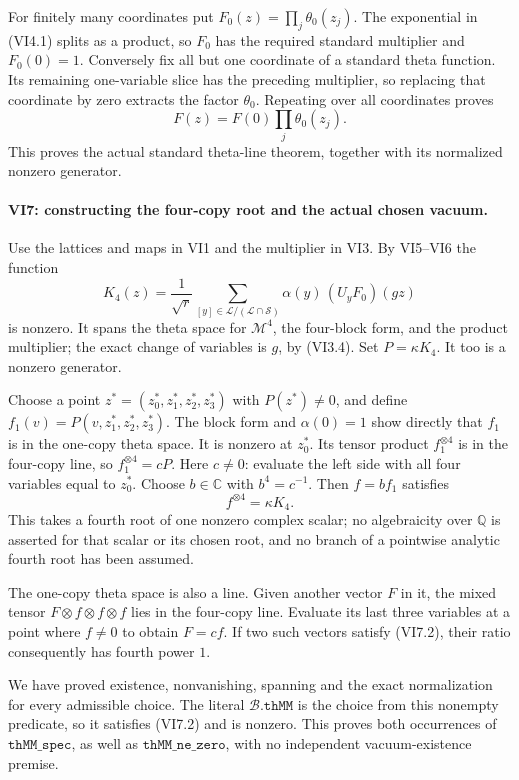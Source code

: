 For finitely many coordinates put
\(F_0(z)=\prod_j\theta_0(z_j)\). The exponential in (VI4.1)
splits as a product, so \(F_0\) has the required standard
multiplier and \(F_0(0)=1\). Conversely fix all but one
coordinate of a standard theta function. Its remaining
one-variable slice has the preceding multiplier, so replacing
that coordinate by zero extracts the factor \(\theta_0\).
Repeating over all coordinates proves
\[
               F(z)=F(0)\prod_j\theta_0(z_j).
 \tag{VI6.2}
\]
This proves the actual standard theta-line theorem, together
with its normalized nonzero generator.

\paragraph{VI7: constructing the four-copy root and the actual chosen vacuum.}
Use the lattices and maps in VI1 and the multiplier in VI3.
By VI5--VI6 the function
\[
 K_4(z)=
 \frac1{\sqrt r}
 \sum_{[y]\in\mathcal L/(\mathcal L\cap\mathcal S)}
       \alpha(y)\,(U_yF_0)(gz)
 \tag{VI7.1}
\]
is nonzero. It spans the theta space for \(\mathcal M^4\),
the four-block form, and the product multiplier; the exact
change of variables is \(g\), by (VI3.4).
Set \(P=\kappa K_4\). It too is a nonzero generator.

Choose a point \(z^*=(z_0^*,z_1^*,z_2^*,z_3^*)\) with
\(P(z^*)\ne0\), and define
\(f_1(v)=P(v,z_1^*,z_2^*,z_3^*)\).
The block form and \(\alpha(0)=1\) show directly that \(f_1\)
is in the one-copy theta space. It is nonzero at \(z_0^*\).
Its tensor product \(f_1^{\otimes4}\) is in the four-copy line,
so \(f_1^{\otimes4}=cP\). Here \(c\ne0\): evaluate the left
side with all four variables equal to \(z_0^*\).
Choose \(b\in\mathbb C\) with \(b^4=c^{-1}\). Then
\(f=bf_1\) satisfies
\[
                   f^{\otimes4}=\kappa K_4.
 \tag{VI7.2}
\]
This takes a fourth root of one nonzero complex scalar; no
algebraicity over \(\mathbb Q\) is asserted for that scalar
or its chosen root, and no branch of a pointwise analytic
fourth root has been assumed.

The one-copy theta space is also a line. Given another vector
\(F\) in it, the mixed tensor \(F\otimes f\otimes f\otimes f\)
lies in the four-copy line. Evaluate its last three variables
at a point where \(f\ne0\) to obtain \(F=cf\).
If two such vectors satisfy (VI7.2), their ratio consequently
has fourth power \(1\).

We have proved existence, nonvanishing, spanning and the exact
normalization for every admissible choice. The literal
\(\mathscr B.\texttt{thMM}\) is the choice from this nonempty
predicate, so it satisfies (VI7.2) and is nonzero.
This proves both occurrences of \(\texttt{thMM\_spec}\), as
well as \(\texttt{thMM\_ne\_zero}\), with no independent
vacuum-existence premise.

